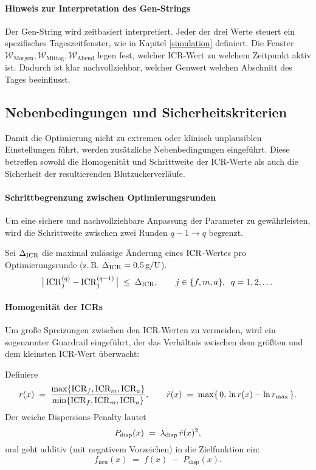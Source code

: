 \paragraph{Hinweis zur Interpretation des Gen-Strings}
\noindent Der Gen-String wird zeitbasiert interpretiert. Jeder der drei Werte steuert ein spezifisches Tageszeitfenster, wie in Kapitel \ref{simulation} definiert. Die Fenster \(\mathcal W_{\mathrm{Morgen}}, \mathcal W_{\mathrm{Mittag}}, \mathcal W_{\mathrm{Abend}}\) legen fest, welcher ICR-Wert zu welchem Zeitpunkt aktiv ist. Dadurch ist klar nachvollziehbar, welcher Genwert welchen Abschnitt des Tages beeinflusst.

\subsection{Nebenbedingungen und Sicherheitskriterien}

Damit die Optimierung nicht zu extremen oder klinisch unplausiblen Einstellungen führt, werden zusätzliche Nebenbedingungen eingeführt. Diese betreffen sowohl die Homogenität und Schrittweite der ICR-Werte als auch die Sicherheit der resultierenden Blutzuckerverläufe. \\

\paragraph{Schrittbegrenzung zwischen Optimierungsrunden}

Um eine sichere und nachvollziehbare Anpassung der Parameter zu gewährleisten, wird die Schrittweite zwischen zwei Runden \(q-1 \to q\) begrenzt.

\noindent Sei \(\Delta_{\mathrm{ICR}}\) die maximal zulässige Änderung eines \(\mathrm{ICR}\)-Wertes pro Optimierungsrunde (z.\,B. \(\Delta_{\mathrm{ICR}}=0{,}5\,\mathrm{g}/\mathrm{U}\)). 
\[
\bigl|\,\mathrm{ICR}_j^{(q)} - \mathrm{ICR}_j^{(q-1)}\,\bigr| \;\le\; \Delta_{\mathrm{ICR}},
\qquad j \in \{f,m,a\},\;\; q=1,2,\dots
\]

\medskip
\paragraph{Homogenität der ICRs}
Um große Spreizungen zwischen den ICR-Werten zu vermeiden, wird ein sogenannter Guardrail eingeführt, der das Verhältnis zwischen dem größten und dem kleinsten ICR-Wert überwacht:

\noindent Definiere
\[
r(x)\;=\;\frac{\max\{\mathrm{ICR}_f,\mathrm{ICR}_m,\mathrm{ICR}_a\}}{\min\{\mathrm{ICR}_f,\mathrm{ICR}_m,\mathrm{ICR}_a\}},
\qquad
\tilde r(x)\;=\;\max\{\,0,\,\ln r(x)-\ln r_{\max}\,\}.
\]
Der weiche Dispersions-Penalty lautet
\[
P_{\mathrm{disp}}(x)\;=\;\lambda_{\mathrm{disp}}\,\tilde r(x)^{2},
\]
und geht additiv (mit negativem Vorzeichen) in die Zielfunktion ein:
\[
f_{\text{neu}}(x)\;=\;f(x)\;-\;P_{\mathrm{disp}}(x).
\]

